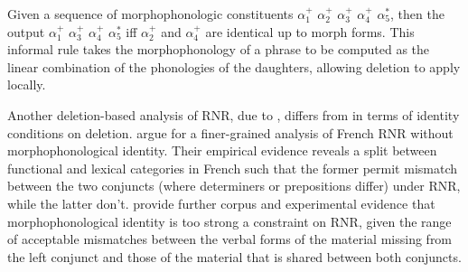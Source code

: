 \documentclass[output=paper
                ,modfonts
                ,nonflat
	        ,collection
	        ,collectionchapter
	        ,collectiontoclongg
 	        ,biblatex
                ,babelshorthands
                ,newtxmath
                ,draftmode
                ,colorlinks, citecolor=brown
]{./langsci/langscibook}
\begin{document}
Given a sequence of morphophonologic constituents $\alpha_{1}^{+}$ $\alpha_{2}^{+}$ $\alpha_{3}^{+}$ $\alpha_{4}^{+}$ $\alpha_{5}^{*}$, then the output
$\alpha_{1}^{+}$ $\alpha_{3}^{+}$ $\alpha_{4}^{+}$ $\alpha_{5}^{*}$
iff $\alpha_{2}^{+}$ and $\alpha_{4}^{+}$ are identical up to morph forms.
\z
This informal rule takes the morphophonology of a phrase to be computed as the linear combination of the phonologies of the daughters, allowing deletion to apply locally.
 


\iffalse{
\citeauthor{Chaves2014}' (\citeyear[874]{Chaves2014}) constraint licensing true RNR is given in \ref{50}. It permits the M(orpho)P(honology) feature of the mother to contain only one instance (represented as $L_{3}$ in (\ref{63})) of the two morphophonologically identical sequences [FORM $F_{1}$], \ldots, [FORM $F_{n}$] present in the daughters; the leftmost of these sequences undergoes deletion. The final list in the mother, $L_{4}$, may be empty or nonempty, depending on whether RNRaised material is discontinuous.
%



\ea
\label{63}
Backward periphery deletion construction:\\
\avmtmp{\small
[\type*{phrase}
  mp $L_{1}$:\type{ne-list} $\bigcirc L_{2}$:\type{ne-list} $\bigcirc L_{3} \bigcirc L_{4}$ & ]
} $\to$
\avmtmp{
 [ \type*{phrase}
    mp $L_{1} \bigcirc$ < [ form $F_{1}$ ], \ldots, [ form $F_{n}$ ] > $\bigcirc L_{2} \bigcirc L_{3}:$%
     <[ form $F_{1}$ ], \ldots, [form $F_{n}$ ] > $\bigcirc L_{4}$ & ]
}
\z
}\fi 

Another deletion-based analysis of RNR, due to \citep{Abeille2016, Shiraishi2019}, differs from \citet{Chaves2014} in terms of identity conditions on deletion.  \citet{Abeille2016} argue for a finer-grained analysis of French RNR without morphophonological identity. Their empirical evidence reveals a split between functional and lexical categories in French such that the former permit mismatch between the two conjuncts (where determiners or prepositions differ) under RNR, while the latter don't. \citep{Shiraishi2019} provide further corpus and experimental evidence that morphophonological identity is too strong a constraint on RNR, given the range of acceptable mismatches between the verbal forms of the material missing from the left conjunct and those of the material that is shared between both conjuncts.
\end{document}
